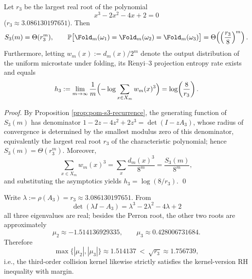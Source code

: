 \begin{corollary}\label{cor:pom-s3-asymptotic}
Let \(r_3\) be the largest real root of the polynomial
$$
x^3-2x^2-4x+2=0
$$
(\(r_3\approx 3.086130197651\)). Then
$$
S_3(m)=\Theta(r_3^m),
\qquad
\mathbb{P}\bigl[\Fold_m(\omega_1)=\Fold_m(\omega_2)=\Fold_m(\omega_3)\bigr]
=\Theta\!\left(\left(\frac{r_3}{8}\right)^m\right).
$$
Furthermore, letting \(w_m(x):=d_m(x)/2^m\) denote the output distribution of the uniform microstate under folding, its \(\mathrm{R\acute{e}nyi}\)--3 projection entropy rate exists and equals
$$
h_3:=\lim_{m\to\infty}\frac{1}{m}\Bigl(-\log\sum_{x\in X_m}w_m(x)^3\Bigr)
=\log\!\left(\frac{8}{r_3}\right).
$$
\end{corollary}
\begin{proof}
By Proposition \ref{prop:pom-s3-recurrence}, the generating function of \(S_3(m)\) has denominator \(1-2z-4z^2+2z^3=\det(I-zA_3)\), whose radius of convergence is determined by the smallest modulus zero of this denominator, equivalently the largest real root \(r_3\) of the characteristic polynomial; hence \(S_3(m)=\Theta(r_3^m)\). Moreover,
$$
\sum_{x\in X_m}w_m(x)^3=\sum_x \frac{d_m(x)^3}{8^m}=\frac{S_3(m)}{8^m},
$$
and substituting the asymptotics yields \(h_3=\log(8/r_3)\). \qed
\end{proof}

\begin{remark}\label{rem:pom-collision-rh-margin-a3}
Write \(\lambda:=\rho(A_3)=r_3\approx 3.086130197651\). From
\[
\det(\lambda I-A_3)=\lambda^3-2\lambda^2-4\lambda+2
\]
all three eigenvalues are real; besides the Perron root, the other two roots are approximately
\[
\mu_2\approx -1.514136929335,\qquad
\mu_3\approx 0.428006731684.
\]
Therefore
\[
\max\{|\mu_2|,|\mu_3|\}\approx 1.514137\ <\ \sqrt{r_3}\approx 1.756739,
\]
i.e., the third-order collision kernel likewise strictly satisfies the kernel-version RH inequality with margin.
\end{remark}


